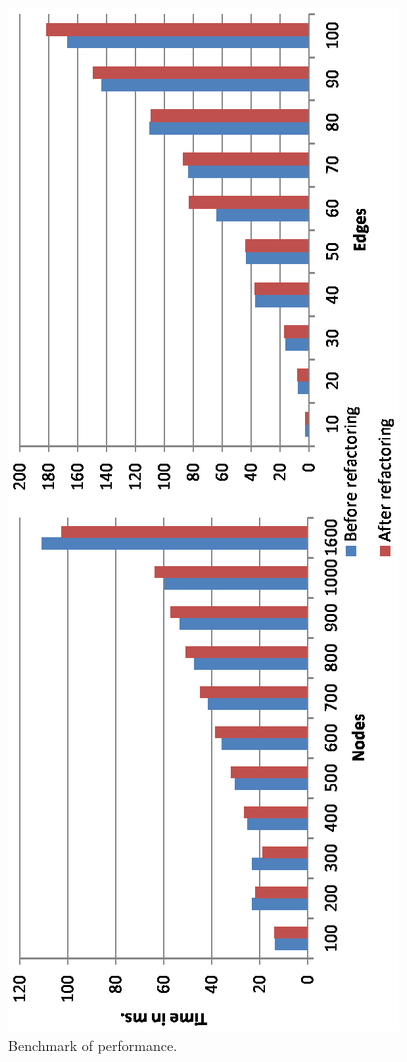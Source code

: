 \documentclass[preprint,10pt]{sigplanconf}
\begin{document}
\begin{figure}
\begin{centering}
\includegraphics[bb=55bp 65bp 280bp 630bp,clip,angle=-90,scale=0.80]{benchmarks.eps}
\par\end{centering}

\caption{Benchmark of performance.\label{fig:Benchmark}}

\end{figure}
\end{document}
